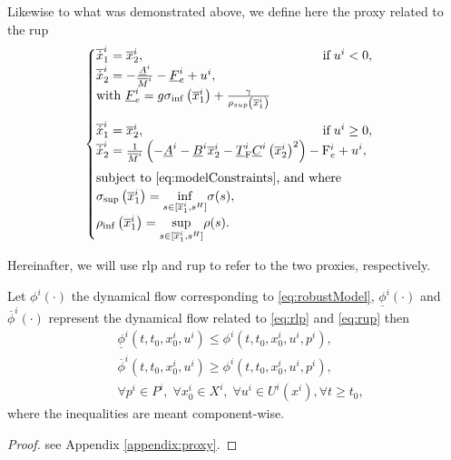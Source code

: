 Likewise to what was demonstrated above, we define here the proxy related to the \gls{rup}
\begin{equation}
	\begin{cases}
		\overline{\dot{x}}_1^i =   \overline{x}_2^i, \qquad  \qquad \qquad \qquad \qquad \qquad  \qquad  \text{if} \; u^i < 0,  \\
		\overline{\dot{x}}_2^i =  -\frac{\underline{A}^i}{\overline{M}^i}-\underline{F}_e^i + u^i, \\
		\textrm{with } \underline{F}_e^i =  g \sigma_{\inf}\left(\overline{x}^i_1\right)+ \frac{\gamma}{\rho_{sup}\left(\overline{x}^i_1\right)} \\
		\noalign{\vskip9pt}
		\overline{\dot{x}}_1^i =   \overline{x}_2^i, \qquad \qquad \qquad  \qquad \qquad \qquad \qquad \text{if} \; u^i \geq 0,  \\
		\overline{\dot{x}}_2^i =  \frac{1}{\overline{M}^i} \left(-\underline{A}^i - \underline{B}^i \overline{x}^i_2 - \underline{T}^i_\mathrm{F} \underline{C}^i \left(\overline{x}^i_2\right)^2 \right) -\mathrm{F}_e^i  + u^i, \\
		\noalign{\vskip5pt}
		\textrm{subject to } \eqref{eq:modelConstraints} \textrm{, and where} \\
		\sigma_{\sup}\left(\overline{x}^i_1\right) = \underset{s \in [\overline{x}_1^i,s^H]}{\inf} \sigma(s), \\
		\rho_{\inf}\left(\overline{x}^i_1\right) = \underset{s \in [\overline{x}_1^i,s^H]}{\sup} \rho(s).
	\end{cases}
\end{equation}

Hereinafter, we will use \gls{rlp} and \gls{rup} to refer to the two proxies, respectively.

\begin{lemma} \label{lemma:Proxies}
	Let ${\phi}^i(\cdot)$ the dynamical flow corresponding to \eqref{eq:robustModel}, $\underline{\phi}^i\left(\cdot \right)$ and   $\overline{\phi}^i\left(\cdot \right)$ represent the dynamical flow related to \eqref{eq:rlp} and \eqref{eq:rup}  then
	\begin{subequations}
		\begin{align} 
			&\underline{\phi}^i\left(t,t_0,x_0^i,u^i\right) \leq \phi^i\left(t,t_0,x_0^i,u^i,p^i\right), \label{lemma:rlpProxy}\\
			&\overline{\phi}^i\left(t,t_0,x_0^i,u^i\right) \geq \phi^i\left(t,t_0,x_0^i,u^i,p^i\right), \label{lemma:rupProxy}\\
			&\forall p^i \in P^i, \; \forall x_0^i \in X^i,\; \forall u^i \in U^i\left(x^i\right), \forall t \geq t_0, \nonumber
		\end{align}
	\end{subequations}
	where the inequalities are meant component-wise.
	\begin{proof}
		see Appendix \ref{appendix:proxy}.
	\end{proof}
\end{lemma}




